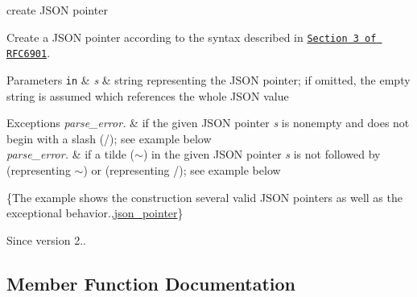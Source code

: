 create J\+S\+ON pointer 

Create a J\+S\+ON pointer according to the syntax described in \href{https://tools.ietf.org/html/rfc6901#section-3}{\tt Section 3 of R\+F\+C6901}.


\begin{DoxyParams}[1]{Parameters}
\mbox{\tt in}  & {\em s} & string representing the J\+S\+ON pointer; if omitted, the empty string is assumed which references the whole J\+S\+ON value\\
\hline
\end{DoxyParams}

\begin{DoxyExceptions}{Exceptions}
{\em parse\+\_\+error.} & if the given J\+S\+ON pointer {\itshape s} is nonempty and does not begin with a slash ({\ttfamily /}); see example below\\
\hline
{\em parse\+\_\+error.} & if a tilde ({\ttfamily $\sim$}) in the given J\+S\+ON pointer {\itshape s} is not followed by {} (representing {\ttfamily $\sim$}) or {} (representing {\ttfamily /}); see example below\\
\hline
\end{DoxyExceptions}
\{The example shows the construction several valid J\+S\+ON pointers as well as the exceptional behavior.,\hyperlink{classnlohmann_1_1basic__json_1_1json__pointer}{json\+\_\+pointer}\}

\begin{DoxySince}{Since}
version 2.. 
\end{DoxySince}


\subsection{Member Function Documentation}
\mbox{\label{classnlohmann_1_1basic__json_1_1json__pointer_aa2583b66886218c1a035e3e507a5f931}} 
